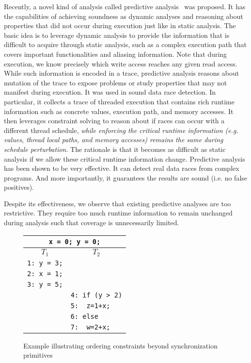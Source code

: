 Recently, a novel kind of analysis called predictive analysis~\cite{yannis,pldi14,Said:2011} was proposed. It has the capabilities of 
achieving soundness as dynamic analyses and reasoning about properties that did not occur during execution 
just like in static analysis. The basic idea is to leverage dynamic analysis to provide the information that 
is difficult to acquire through static analysis, such as a complex execution path that covers important functionalities 
and aliasing information. Note that during execution, we know precisely which write access reaches any given read 
access. While such information is encoded in a trace, predictive analysis reasons about mutation of the trace to 
expose problems or study properties that may not manifest during execution. It was used in sound data race detection. 
In particular, it collects a trace of threaded execution that contains rich runtime information such as concrete values, 
execution path, and memory accesses. It then leverages constraint solving to reason about if races can occur with
a different thread schedule, {\em while enforcing the critical runtime information (e.g. values, thread
local paths, and memory accesses) remains the same during schedule perturbation}. The rationale is that 
it becomes as difficult as static analysis if we allow these critical runtime information change. 
Predictive analysis has been shown to be very effective. It can detect real data races from complex programs.
And more importantly, it guarantees the results are sound (i.e. no false positives).

Despite its effectiveness, we observe that existing predictive analyses are too restrictive. They 
require too much runtime information to remain unchanged during analysis such that coverage is unnecessarily
limited. 


\begin{figure}
\centering
\begin{tabular}{ll}
\multicolumn{2}{c}{{\tt x = 0; y = 0;}} \\  %
\hline
\multicolumn{1}{c}{$T_1$} & \multicolumn{1}{c}{$T_2$} \\
\hline
{\tt 1: y = 3;} & \\
{\tt 2: x = 1;} & \\
{\tt 3: y = 5;} & \\
& {\tt 4: if (y > 2)} \\
& {\tt 5:~~z=1+x;} \\	
& {\color{red} {\tt 6: else}} \\
& {\color{red} {\tt 7:~~w=2+x;}}
\end{tabular}
\caption{Example illustrating ordering constraints beyond synchronization primitives}
\label{fig:running}
\end{figure}

